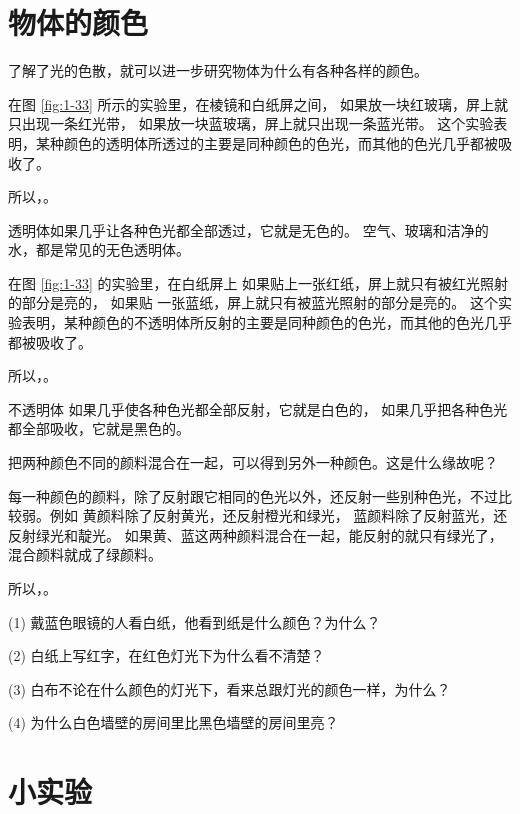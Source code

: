 \section{物体的颜色}\label{sec:1-10}

了解了光的色散，就可以进一步研究物体为什么有各种各样的颜色。

在图 \ref{fig:1-33} 所示的实验里，在棱镜和白纸屏之间，
如果放一块红玻璃，屏上就只出现一条红光带，
如果放一块蓝玻璃，屏上就只出现一条蓝光带。
这个实验表明，某种颜色的透明体所透过的主要是同种颜色的色光，而其他的色光几乎都被吸收了。

所以，。

透明体如果几乎让各种色光都全部透过，它就是无色的。
空气、玻璃和洁净的水，都是常见的无色透明体。

在图 \ref{fig:1-33} 的实验里，在白纸屏上
如果贴上一张红纸，屏上就只有被红光照射的部分是亮的，
如果贴  一张蓝纸，屏上就只有被蓝光照射的部分是亮的。
这个实验表明，某种颜色的不透明体所反射的主要是同种颜色的色光，而其他的色光几乎都被吸收了。

所以，。

不透明体
如果几乎使各种色光都全部反射，它就是白色的，
如果几乎把各种色光都全部吸收，它就是黑色的。

把两种颜色不同的颜料混合在一起，可以得到另外一种颜色。这是什么缘故呢？

每一种颜色的颜料，除了反射跟它相同的色光以外，还反射一些别种色光，不过比较弱。例如
黄颜料除了反射黄光，还反射橙光和绿光，
蓝颜料除了反射蓝光，还反射绿光和靛光。
如果黄、蓝这两种颜料混合在一起，能反射的就只有绿光了，混合颜料就成了绿颜料。

所以，。



\lianxi

(1) 戴蓝色眼镜的人看白纸，他看到纸是什么颜色？为什么？

(2) 白纸上写红字，在红色灯光下为什么看不清楚？

(3) 白布不论在什么颜色的灯光下，看来总跟灯光的颜色一样，为什么？

(4) 为什么白色墙壁的房间里比黑色墙壁的房间里亮？




\section*{小实验}

